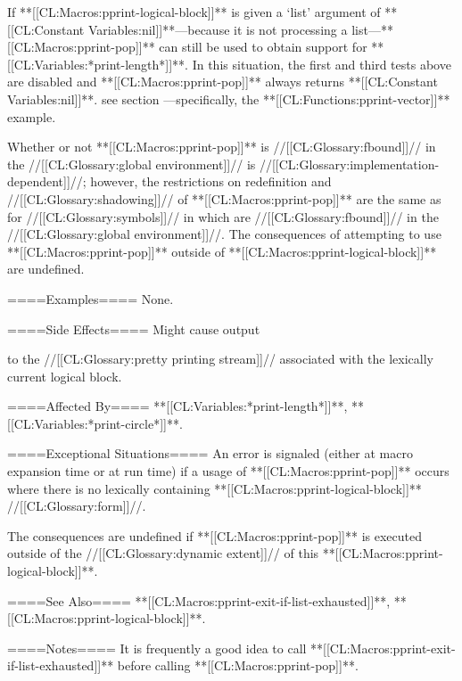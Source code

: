 If **[[CL:Macros:pprint-logical-block]]** is given a `list' argument of **[[CL:Constant Variables:nil]]**---because it is not processing a list---**[[CL:Macros:pprint-pop]]** can still be used to obtain support for **[[CL:Variables:*print-length*]]**. In this situation, the first and third tests above are disabled and **[[CL:Macros:pprint-pop]]** always returns **[[CL:Constant Variables:nil]]**. see section {\secref\PrettyPrinterExamples}---specifically, the **[[CL:Functions:pprint-vector]]** example.

Whether or not **[[CL:Macros:pprint-pop]]** is //[[CL:Glossary:fbound]]// in the //[[CL:Glossary:global environment]]// is //[[CL:Glossary:implementation-dependent]]//; however, the restrictions on redefinition and //[[CL:Glossary:shadowing]]// of **[[CL:Macros:pprint-pop]]** are the same as for //[[CL:Glossary:symbols]]// in  which are //[[CL:Glossary:fbound]]// in the //[[CL:Glossary:global environment]]//. The consequences of attempting to use **[[CL:Macros:pprint-pop]]** outside of **[[CL:Macros:pprint-logical-block]]** are undefined.

====Examples====
None.

====Side Effects====
Might cause output

to the //[[CL:Glossary:pretty printing stream]]// associated with the lexically current logical block.

====Affected By====
**[[CL:Variables:*print-length*]]**, **[[CL:Variables:*print-circle*]]**.

====Exceptional Situations====
An error is signaled (either at macro expansion time or at run time) if a usage of **[[CL:Macros:pprint-pop]]** occurs where there is no lexically containing **[[CL:Macros:pprint-logical-block]]** //[[CL:Glossary:form]]//.

The consequences are undefined if **[[CL:Macros:pprint-pop]]** is executed outside of the //[[CL:Glossary:dynamic extent]]// of this **[[CL:Macros:pprint-logical-block]]**.

====See Also====
**[[CL:Macros:pprint-exit-if-list-exhausted]]**, **[[CL:Macros:pprint-logical-block]]**.

====Notes====
It is frequently a good idea to call **[[CL:Macros:pprint-exit-if-list-exhausted]]** before calling **[[CL:Macros:pprint-pop]]**.

 
